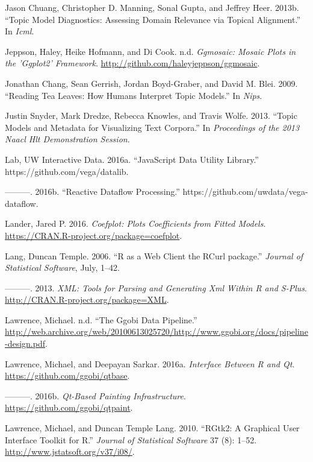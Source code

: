 \documentclass[12pt,]{isuthesis}
\begin{document}
\hypertarget{ref-2013-diagnostics}{}
Jason Chuang, Christopher D. Manning, Sonal Gupta, and Jeffrey Heer.
2013b. ``Topic Model Diagnostics: Assessing Domain Relevance via Topical
Alignment.'' In \emph{Icml}.

\hypertarget{ref-ggmosaic}{}
Jeppson, Haley, Heike Hofmann, and Di Cook. n.d. \emph{Ggmosaic: Mosaic
Plots in the 'Ggplot2' Framework}.
\url{http://github.com/haleyjeppson/ggmosaic}.

\hypertarget{ref-Chang}{}
Jonathan Chang, Sean Gerrish, Jordan Boyd-Graber, and David M. Blei.
2009. ``Reading Tea Leaves: How Humans Interpret Topic Models.'' In
\emph{Nips}.

\hypertarget{ref-Snyder}{}
Justin Snyder, Mark Dredze, Rebecca Knowles, and Travis Wolfe. 2013.
``Topic Models and Metadata for Visualizing Text Corpora.'' In
\emph{Proceedings of the 2013 Naacl Hlt Demonstration Session}.

\hypertarget{ref-datalib}{}
Lab, UW Interactive Data. 2016a. ``JavaScript Data Utility Library.''
https://github.com/vega/datalib.

\hypertarget{ref-vega-dataflow}{}
---------. 2016b. ``Reactive Dataflow Processing.''
https://github.com/uwdata/vega-dataflow.

\hypertarget{ref-coefplot}{}
Lander, Jared P. 2016. \emph{Coefplot: Plots Coefficients from Fitted
Models}. \url{https://CRAN.R-project.org/package=coefplot}.

\hypertarget{ref-Lang:2006us}{}
Lang, Duncan Temple. 2006. ``R as a Web Client the RCurl package.''
\emph{Journal of Statistical Software}, July, 1--42.

\hypertarget{ref-XML}{}
---------. 2013. \emph{XML: Tools for Parsing and Generating Xml Within
R and S-Plus}. \url{http://CRAN.R-project.org/package=XML}.

\hypertarget{ref-ggobi-pipeline-design}{}
Lawrence, Michael. n.d. ``The Ggobi Data Pipeline.''
\url{http://web.archive.org/web/20100613025720/http://www.ggobi.org/docs/pipeline-design.pdf}.

\hypertarget{ref-qtbase}{}
Lawrence, Michael, and Deepayan Sarkar. 2016a. \emph{Interface Between R
and Qt}. \url{https://github.com/ggobi/qtbase}.

\hypertarget{ref-qtpaint}{}
---------. 2016b. \emph{Qt-Based Painting Infrastructure}.
\url{https://github.com/ggobi/qtpaint}.

\hypertarget{ref-RGtk2}{}
Lawrence, Michael, and Duncan Temple Lang. 2010. ``RGtk2: A Graphical
User Interface Toolkit for R.'' \emph{Journal of Statistical Software}
37 (8): 1--52. \url{http://www.jstatsoft.org/v37/i08/}.
\end{document}
